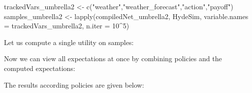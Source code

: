 \documentclass[
]{article}
\newenvironment{Shaded}{\begin{snugshade}}{\end{snugshade}}
\newcommand{\AttributeTok}[1]{\textcolor[rgb]{0.77,0.63,0.00}{#1}}
\newcommand{\ControlFlowTok}[1]{\textcolor[rgb]{0.13,0.29,0.53}{\textbf{#1}}}
\newcommand{\DecValTok}[1]{\textcolor[rgb]{0.00,0.00,0.81}{#1}}
\newcommand{\FunctionTok}[1]{\textcolor[rgb]{0.00,0.00,0.00}{#1}}
\newcommand{\NormalTok}[1]{#1}
\newcommand{\OtherTok}[1]{\textcolor[rgb]{0.56,0.35,0.01}{#1}}
\newcommand{\SpecialCharTok}[1]{\textcolor[rgb]{0.00,0.00,0.00}{#1}}
\newcommand{\StringTok}[1]{\textcolor[rgb]{0.31,0.60,0.02}{#1}}
\begin{document}
\begin{Shaded}
\begin{Highlighting}[]
\NormalTok{trackedVars\_umbrella2 }\OtherTok{\textless{}{-}} \FunctionTok{c}\NormalTok{(}\StringTok{"weather"}\NormalTok{,}\StringTok{"weather\_forecast"}\NormalTok{,}\StringTok{"action"}\NormalTok{,}\StringTok{"payoff"}\NormalTok{)}
\NormalTok{samples\_umbrella2 }\OtherTok{\textless{}{-}} \FunctionTok{lapply}\NormalTok{(compiledNet\_umbrella2,}
\NormalTok{                     HydeSim,}
                     \AttributeTok{variable.names =}\NormalTok{ trackedVars\_umbrella2,}
                     \AttributeTok{n.iter =} \DecValTok{10}\SpecialCharTok{\^{}}\DecValTok{5}\NormalTok{)}
\end{Highlighting}
\end{Shaded}

Let us compute a single utility on samples:

\begin{Shaded}
\end{Shaded}

Now we can view all expectations at once by combining policies and the computed expectations:

\begin{Shaded}
\end{Shaded}

The results according policies are given below:
\end{document}
